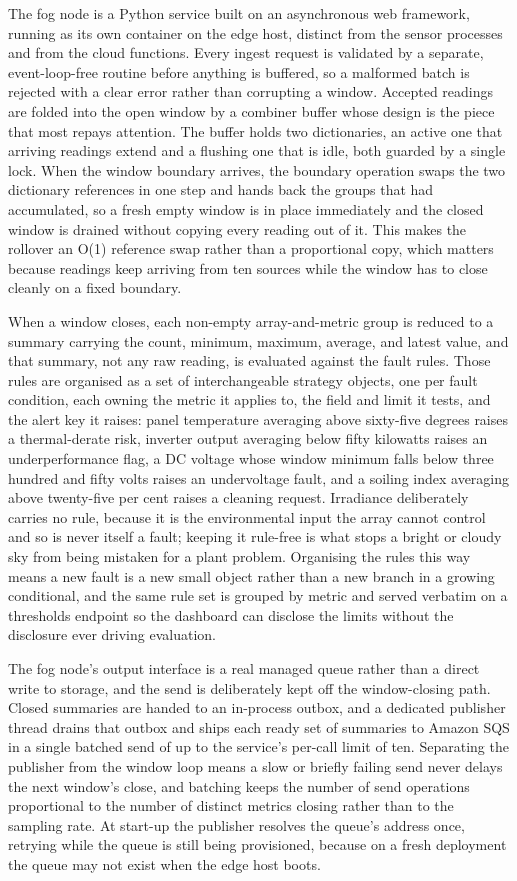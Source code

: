 \documentclass[conference]{IEEEtran}
\begin{document}
The fog node is a Python service built on an asynchronous web framework, running as its own container on the edge host, distinct from the sensor processes and from the cloud functions. Every ingest request is validated by a separate, event-loop-free routine before anything is buffered, so a malformed batch is rejected with a clear error rather than corrupting a window. Accepted readings are folded into the open window by a combiner buffer whose design is the piece that most repays attention. The buffer holds two dictionaries, an active one that arriving readings extend and a flushing one that is idle, both guarded by a single lock. When the window boundary arrives, the boundary operation swaps the two dictionary references in one step and hands back the groups that had accumulated, so a fresh empty window is in place immediately and the closed window is drained without copying every reading out of it. This makes the rollover an O(1) reference swap rather than a proportional copy, which matters because readings keep arriving from ten sources while the window has to close cleanly on a fixed boundary.

When a window closes, each non-empty array-and-metric group is reduced to a summary carrying the count, minimum, maximum, average, and latest value, and that summary, not any raw reading, is evaluated against the fault rules. Those rules are organised as a set of interchangeable strategy objects, one per fault condition, each owning the metric it applies to, the field and limit it tests, and the alert key it raises: panel temperature averaging above sixty-five degrees raises a thermal-derate risk, inverter output averaging below fifty kilowatts raises an underperformance flag, a DC voltage whose window minimum falls below three hundred and fifty volts raises an undervoltage fault, and a soiling index averaging above twenty-five per cent raises a cleaning request. Irradiance deliberately carries no rule, because it is the environmental input the array cannot control and so is never itself a fault; keeping it rule-free is what stops a bright or cloudy sky from being mistaken for a plant problem. Organising the rules this way means a new fault is a new small object rather than a new branch in a growing conditional, and the same rule set is grouped by metric and served verbatim on a thresholds endpoint so the dashboard can disclose the limits without the disclosure ever driving evaluation.

The fog node's output interface is a real managed queue rather than a direct write to storage, and the send is deliberately kept off the window-closing path. Closed summaries are handed to an in-process outbox, and a dedicated publisher thread drains that outbox and ships each ready set of summaries to Amazon SQS in a single batched send of up to the service's per-call limit of ten. Separating the publisher from the window loop means a slow or briefly failing send never delays the next window's close, and batching keeps the number of send operations proportional to the number of distinct metrics closing rather than to the sampling rate. At start-up the publisher resolves the queue's address once, retrying while the queue is still being provisioned, because on a fresh deployment the queue may not exist when the edge host boots.
\end{document}
